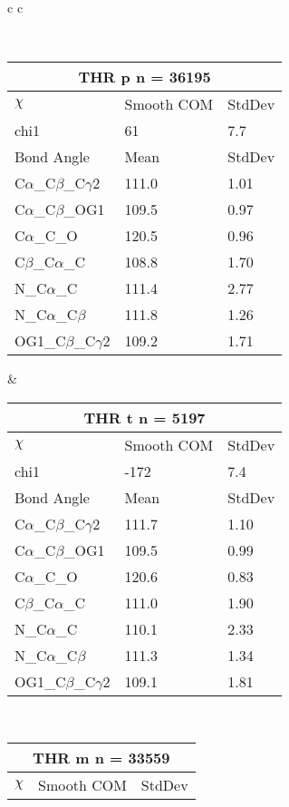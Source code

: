 \newpage

\begin{longtable}{ c c }

\caption{THR Central Values}\\
  \begin{tabular}{ l l l }
  \toprule
  \multicolumn{3}{c}{THR \textbf{p} n = 36195} \\ \toprule
  $\chi$       & Smooth COM & StdDev \\ \midrule
  chi1 & 61 & 7.7 \\ \midrule
  Bond Angle   & Mean     & StdDev \\ \midrule
  C$\alpha$\_C$\beta$\_C$\gamma$2 & 111.0 & 1.01\\
  C$\alpha$\_C$\beta$\_OG1 & 109.5 & 0.97\\
  C$\alpha$\_C\_O & 120.5 & 0.96\\
  C$\beta$\_C$\alpha$\_C & 108.8 & 1.70\\
  N\_C$\alpha$\_C & 111.4 & 2.77\\
  N\_C$\alpha$\_C$\beta$ & 111.8 & 1.26\\
  OG1\_C$\beta$\_C$\gamma$2 & 109.2 & 1.71\\
  \bottomrule
  \end{tabular}
  &
  \begin{tabular}{ l l l }
  \toprule
  \multicolumn{3}{c}{THR \textbf{t} n = 5197} \\ \toprule
  $\chi$       & Smooth COM & StdDev \\ \midrule
  chi1 & -172 & 7.4 \\ \midrule
  Bond Angle   & Mean     & StdDev \\ \midrule
  C$\alpha$\_C$\beta$\_C$\gamma$2 & 111.7 & 1.10\\
  C$\alpha$\_C$\beta$\_OG1 & 109.5 & 0.99\\
  C$\alpha$\_C\_O & 120.6 & 0.83\\
  C$\beta$\_C$\alpha$\_C & 111.0 & 1.90\\
  N\_C$\alpha$\_C & 110.1 & 2.33\\
  N\_C$\alpha$\_C$\beta$ & 111.3 & 1.34\\
  OG1\_C$\beta$\_C$\gamma$2 & 109.1 & 1.81\\
  \bottomrule
  \end{tabular}
  \\
  \begin{tabular}{ l l l }
  \toprule
  \multicolumn{3}{c}{THR \textbf{m} n = 33559} \\ \toprule
  $\chi$       & Smooth COM & StdDev \\ \midrule

\end{tabular}
\end{longtable}
